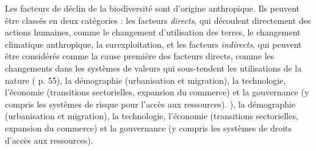 \begin{displayquote}
\begin{displayquote}
\begin{displayquote}
Les facteurs de déclin de la biodiversité sont d'origine anthropique. Ils peuvent être classés en deux catégories : les facteurs \textit{directs}, qui découlent directement des actions humaines, comme le changement d'utilisation des terres, le changement climatique anthropique, la surexploitation, et les facteurs \textit{indirects}, qui peuvent être considérés comme la cause première des facteurs directs, comme les changements dans les systèmes de valeurs qui sous-tendent les utilisations de la nature (\cite{ipbes_2022_6417333} p. 55), la démographie (urbanisation et migration), la technologie, l'économie (transitions sectorielles, expansion du commerce) et la gouvernance (y compris les systèmes de risque pour l'accès aux ressources). ), la démographie (urbanisation et migration), la technologie, l'économie (transitions sectorielles, expansion du commerce) et la gouvernance (y compris les systèmes de droits d'accès aux ressources).


\end{displayquote}
\end{displayquote}
\end{displayquote}
